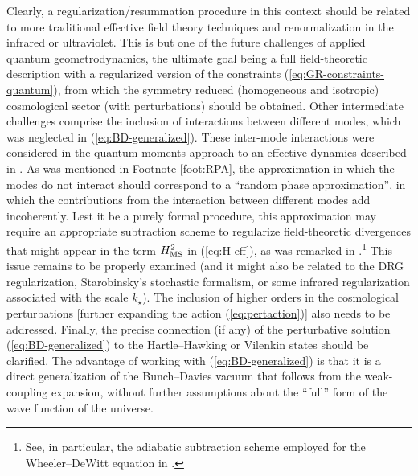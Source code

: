 \documentclass[12pt]{iopart}
\def\eref#1{(\ref{eq:#1})}
\begin{document}
Clearly, a regularization/resummation procedure in this context should be related to more traditional effective field theory techniques and renormalization in the infrared or ultraviolet. This is but one of the future challenges of applied quantum geometrodynamics, the ultimate goal being a full field-theoretic description with a regularized version of the constraints \eref{GR-constraints-quantum}, from which the symmetry reduced (homogeneous and isotropic) cosmological sector (with perturbations) should be obtained. Other intermediate challenges comprise the inclusion of interactions between different modes, which was neglected in \eref{BD-generalized}. These inter-mode interactions were considered in the quantum moments approach to an effective dynamics described in \citet{Brizuela:moment}. As was mentioned in Footnote \ref{foot:RPA}, the approximation in which the modes do not interact should correspond to a ``random phase approximation'', in which the contributions from the interaction between different modes add incoherently. Lest it be a purely formal procedure, 
this approximation may require an appropriate subtraction scheme to regularize field-theoretic divergences that might appear in the term $H_{\rm MS}^2$ in \eref{H-eff}, as was remarked in \citet{Chataignier:2020fap}.\footnote{See, in particular, the adiabatic subtraction scheme employed for the Wheeler--DeWitt equation in \citet{Mazzitelli:1991rf}.} This issue remains to be properly examined (and it might also be related to the DRG regularization, Starobinsky's stochastic formalism, or some infrared regularization associated with the scale $k_{\star}$). The inclusion of higher orders in the cosmological perturbations [further expanding the action \eref{pertaction}] also needs to be addressed. Finally, the precise connection (if any) of the perturbative solution \eref{BD-generalized} to the Hartle--Hawking or Vilenkin states should be clarified. The advantage of working with \eref{BD-generalized} is that it is a direct generalization of the Bunch--Davies vacuum that follows from the weak-coupling expansion, without further assumptions about the ``full'' form of the wave function of the universe.
\end{document}
